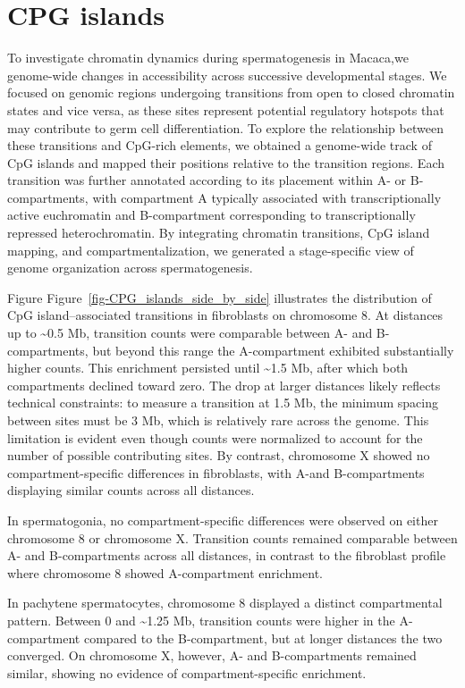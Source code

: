 \documentclass[
  a4paper,
  openany]{scrbook}
\begin{document}
\section{CPG islands}\label{cpg-islands-1}

To investigate chromatin dynamics during spermatogenesis in Macaca,we
genome-wide changes in accessibility across successive developmental
stages. We focused on genomic regions undergoing transitions from open
to closed chromatin states and vice versa, as these sites represent
potential regulatory hotspots that may contribute to germ cell
differentiation. To explore the relationship between these transitions
and CpG-rich elements, we obtained a genome-wide track of CpG islands
and mapped their positions relative to the transition regions. Each
transition was further annotated according to its placement within A- or
B-compartments, with compartment A typically associated with
transcriptionally active euchromatin and B-compartment corresponding to
transcriptionally repressed heterochromatin. By integrating chromatin
transitions, CpG island mapping, and compartmentalization, we generated
a stage-specific view of genome organization across spermatogenesis.

Figure Figure~\ref{fig-CPG_islands_side_by_side} illustrates the
distribution of CpG island--associated transitions in fibroblasts on
chromosome 8. At distances up to \textasciitilde0.5 Mb, transition
counts were comparable between A- and B-compartments, but beyond this
range the A-compartment exhibited substantially higher counts. This
enrichment persisted until \textasciitilde1.5 Mb, after which both
compartments declined toward zero. The drop at larger distances likely
reflects technical constraints: to measure a transition at 1.5 Mb, the
minimum spacing between sites must be 3 Mb, which is relatively rare
across the genome. This limitation is evident even though counts were
normalized to account for the number of possible contributing sites. By
contrast, chromosome X showed no compartment-specific differences in
fibroblasts, with A-and B-compartments displaying similar counts across
all distances.

In spermatogonia, no compartment-specific differences were observed on
either chromosome 8 or chromosome X. Transition counts remained
comparable between A- and B-compartments across all distances, in
contrast to the fibroblast profile where chromosome 8 showed
A-compartment enrichment.

In pachytene spermatocytes, chromosome 8 displayed a distinct
compartmental pattern. Between 0 and \textasciitilde1.25 Mb, transition
counts were higher in the A-compartment compared to the B-compartment,
but at longer distances the two converged. On chromosome X, however, A-
and B-compartments remained similar, showing no evidence of
compartment-specific enrichment.
\end{document}
